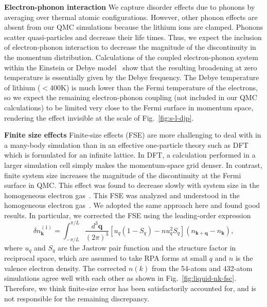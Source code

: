 \documentclass[aps,prb,showpacs,preprintnumbers,amsmath,amssymb,superscriptaddress,twocolumn]{revtex4-1}
\newcommand{\bs}{\boldsymbol}
\begin{document}
{\bf Electron-phonon interaction} We capture disorder effects due to phonons by averaging over thermal atomic configurations. However, other phonon effects are absent from our QMC simulations because the lithium ions are clamped. Phonons scatter quasi-particles and decrease their life times. Thus, we expect the inclusion of electron-phonon interaction to decrease the magnitude of the discontinuity in the momentum distribution. Calculations of the coupled electron-phonon system within the Einstein or Debye model~\cite{PhysRev.131.993} show that the resulting broadening
at zero temperature is essentially given by the Debye frequency.
The Debye temperature of lithium ($<$400K) is much lower than the Fermi temperature of the electrons, so we expect the remaining electron-phonon coupling (not included
in our QMC calculations) to be limited very close to the Fermi surface in momentum space, rendering the effect invisible at the scale of Fig.~\ref{fig:s-l-djp}.


{\bf Finite size effects}  Finite-size effects (FSE) are more challenging to deal with in a many-body simulation than in an effective one-particle theory such as DFT which is formulated for an infinite lattice. In DFT, a calculation performed in a larger simulation cell simply makes the momentum-space grid denser. In contrast, finite system size increases the magnitude of the discontinuity at the Fermi surface in QMC. This effect was found to decrease slowly with system size in the homogeneous electron gas~\cite{Holzmann2009}. This FSE  was analyzed and understood in the homogeneous electron gas~\cite{Holzmann2009,Holzmann2011}. We adopted the same approach here and found good results. In particular, we corrected the FSE using the leading-order expression
\begin{equation} \label{eq:nk-fsc}
\delta n_{\bs{k}}^{(1)} = \int_{-\pi/L}^{\pi/L} \frac{d^3\bs{q}}{(2\pi)^3} \left[
u_q (1-S_q) - nu_q^2 S_q
\right] (n_{\bs{k}+\bs{q}}-n_{\bs{k}}),
\end{equation}
where $u_q$ and $S_q$ are the Jastrow pair function and the structure factor in reciprocal space, which are assumed to take RPA forms at small $q$ and $n$ is the valence electron density. The corrected $n(k)$ from the 54-atom and 432-atom simulations agree well with each other as shown in Fig.~\ref{fig:liquid-nk-fsc}. Therefore, we think finite-size error has been satisfactorily accounted for, and is not responsible for the remaining discrepancy.
\end{document}
